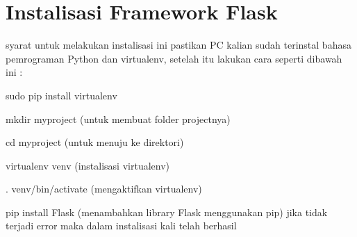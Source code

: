 \section{Instalisasi Framework Flask}
syarat untuk melakukan instalisasi ini pastikan PC kalian sudah terinstal bahasa pemrograman Python dan virtualenv, setelah
itu lakukan cara seperti dibawah ini :
\item sudo pip install virtualenv 
\item mkdir myproject (untuk membuat folder projectnya)
\item cd myproject (untuk menuju ke direktori)
\item virtualenv venv (instalisasi virtualenv)
\item . venv/bin/activate (mengaktifkan virtualenv)
\item pip install Flask (menambahkan library Flask menggunakan pip)
jika tidak terjadi error maka dalam instalisasi kali telah berhasil



